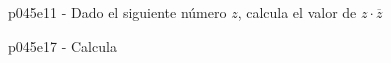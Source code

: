 \documentclass[spanish, 11pt]{exam}
\begin{document}
\begin{questions}
        \question p045e11 - Dado el siguiente número $z$, calcula el valor de $z\cdot\overline{z}$
        \begin{multicols}{2} 
        \end{multicols}
        \question p045e17 - Calcula
        \begin{multicols}{2} 

\end{multicols}
\end{questions}
\end{document}
